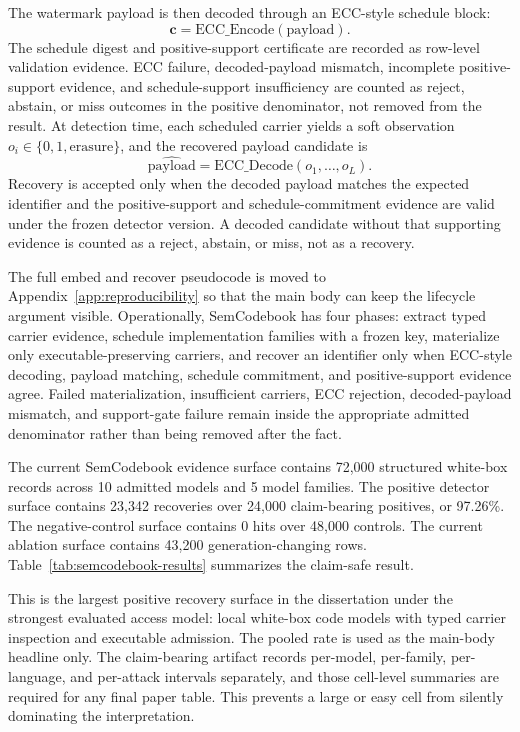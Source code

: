 The watermark payload is then decoded through an ECC-style schedule block:
\begin{equation}
  \mathbf{c} = \mathrm{ECC\_Encode}(\mathrm{payload}).
\end{equation}
The schedule digest and positive-support certificate are recorded as row-level validation evidence. ECC failure, decoded-payload mismatch, incomplete positive-support evidence, and schedule-support insufficiency are counted as reject, abstain, or miss outcomes in the positive denominator, not removed from the result.
At detection time, each scheduled carrier yields a soft observation $o_i \in \{0,1,\mathrm{erasure}\}$, and the recovered payload candidate is
\begin{equation}
  \widehat{\mathrm{payload}} = \mathrm{ECC\_Decode}(o_1,\ldots,o_L).
\end{equation}
Recovery is accepted only when the decoded payload matches the expected identifier and the positive-support and schedule-commitment evidence are valid under the frozen detector version. A decoded candidate without that supporting evidence is counted as a reject, abstain, or miss, not as a recovery.

The full embed and recover pseudocode is moved to Appendix~\ref{app:reproducibility} so that the main body can keep the lifecycle argument visible. Operationally, SemCodebook has four phases: extract typed carrier evidence, schedule implementation families with a frozen key, materialize only executable-preserving carriers, and recover an identifier only when ECC-style decoding, payload matching, schedule commitment, and positive-support evidence agree. Failed materialization, insufficient carriers, ECC rejection, decoded-payload mismatch, and support-gate failure remain inside the appropriate admitted denominator rather than being removed after the fact.

The current SemCodebook evidence surface contains 72,000 structured white-box records across 10 admitted models and 5 model families. The positive detector surface contains 23,342 recoveries over 24,000 claim-bearing positives, or 97.26\%. The negative-control surface contains 0 hits over 48,000 controls. The current ablation surface contains 43,200 generation-changing rows. Table~\ref{tab:semcodebook-results} summarizes the claim-safe result.

This is the largest positive recovery surface in the dissertation under the strongest evaluated access model: local white-box code models with typed carrier inspection and executable admission. The pooled rate is used as the main-body headline only. The claim-bearing artifact records per-model, per-family, per-language, and per-attack intervals separately, and those cell-level summaries are required for any final paper table. This prevents a large or easy cell from silently dominating the interpretation.

